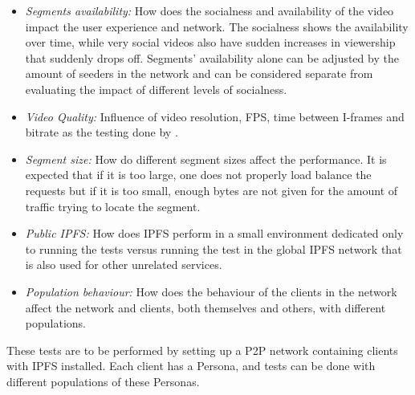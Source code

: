 \begin{itemize}
   \item \textit{Segments availability:}
    How does the socialness and availability of the video impact the user experience and network. The socialness shows the availability over time, while very social videos also have sudden increases in viewership that suddenly drops off. Segments' availability alone can be adjusted by the amount of seeders in the network and can be considered separate from evaluating the impact of different levels of socialness.
    
    \item \textit{Video Quality:}
    Influence of video resolution, \ac{FPS}, time between \acp{I-frame} and bitrate as the testing done by \citeauthor{aloman2015performance}.
    
    \item \textit{Segment size:}
    How do different segment sizes affect the performance. It is expected that if it is too large, one does not properly load balance the requests but if it is too small, enough bytes are not given for the amount of traffic trying to locate the segment.

    \item \textit{Public IPFS:}
    How does \ac{IPFS} perform in a small environment dedicated only to running the tests versus running the test in the global \ac{IPFS} network that is also used for other unrelated services.
    
    \item \textit{Population behaviour:}
    How does the behaviour of the clients in the network affect the network and clients, both themselves and others, with different populations.
\end{itemize}

These tests are to be performed by setting up a \ac{P2P} network containing clients with \ac{IPFS} installed. Each client has a Persona, and tests can be done with different populations of these Personas.

